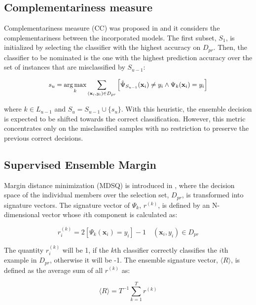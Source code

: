 \subsection{Complementariness measure} \label{ch6_CC}

Complementariness measure (CC) was proposed in \cite{martinez2004} and it considers the complementariness between the incorporated models. The first subset, $S_1$, is initialized by selecting the classifier with the highest accuracy on $D_{pr}$. Then, the classifier to be nominated is the one with the highest prediction accuracy over the set of instances that are misclassified by $S_{u-1}$: 

\begin{equation}
\scalemath{0.95}{
\label{complementary.miss}
s_u=\mathop{\arg\max}\limits_{k} \mathop{\sum}\limits_{(\textbf{x}_i,y_i) \in D_{pr}} \left[\hat{\Psi}_{S_{u-1}} (\textbf{x}_i) \neq y_i  \wedge \Psi_{k}(\textbf{x}_i)=y_i\right] 
}
\end{equation}

\noindent where $k \in L_{u-1}$ and $S_u=S_{u-1} \cup \{s_u\}$. With this heuristic, the ensemble decision is expected to be shifted towards the correct classification. However, this metric concentrates only on the misclassified samples with no restriction to preserve the previous correct decisions.

\subsection{Supervised Ensemble Margin} \label{ch6_MDSQ}
Margin distance minimization (MDSQ) is introduced in \cite{martinez2004,martinez2009}, where the decision space of the individual members over the selection set, $D_{pr}$, is transformed into signature vectors. The signature vector of $\Psi_k$, $r^{(k)}$, is defined by an N-dimensional vector whose $i$th component is calculated as: 

\begin{equation}
\label{sign.vect}
r_{i}^{(k)}=2 \left[\Psi_{k}(\textbf{x}_i)=y_i\right]-1 \quad (\textbf{x}_i,y_i) \in D_{pr}
\end{equation}

 The quantity $r_{i}^{(k)}$ will be 1, if the $k$th classifier correctly classifies the $i$th example in $D_{pr}$, otherwise it will be -1. The ensemble signature vector, $\langle R \rangle$, is defined as the average sum of all $r^{(k)}$ as: 

\begin{equation}
\label{ens.sign}
\langle R \rangle=T^{-1} \mathop{\sum}\limits_{k=1}^{T} r^{(k)} 
\end{equation}

